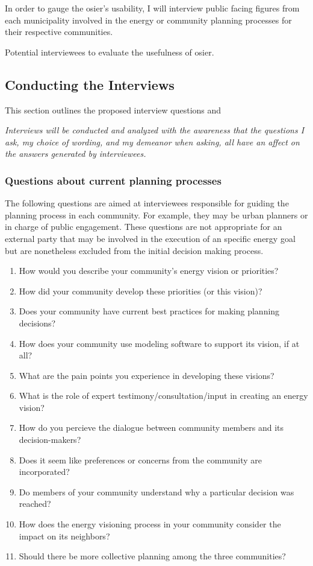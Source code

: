 In order to gauge the \ac{osier}'s usability, I will interview public facing
figures from each municipality involved in the energy or community planning
processes for their respective communities.


\begin{table}[ht!]
    \centering
    \caption{Potential interviewees to evaluate the usefulness of \ac{osier}.}
    
    \label{table:subjects}
\end{table}


\subsection{Conducting the Interviews}

This section outlines the proposed interview questions and 

\textit{Interviews will be conducted and analyzed with the awareness that the
questions I ask, my choice of wording, and my demeanor when asking, all have an
affect on the answers generated by interviewees.}

\subsubsection{Questions about current planning processes}
The following questions are aimed at interviewees responsible for guiding the
planning process in each community. For example, they may be urban planners or
in charge of public engagement. These questions are not appropriate for an
external party that may be involved in the execution of an specific energy goal
but are nonetheless excluded from the initial decision making process.

\begin{enumerate}
    \item How would you describe your community's energy vision or priorities?
    \item How did your community develop these priorities (or this vision)?
    \item Does your community have current best practices for making planning
    decisions?
    \item How does your community use modeling software to support its vision,
    if at all?
    \item What are the pain points you experience in developing these visions?
    \item What is the role of expert testimony/consultation/input in creating an
    energy vision?
    \item How do you percieve the dialogue between community members and its
    decision-makers?
    \item Does it seem like preferences or concerns from the community are
    incorporated? 
    \item Do members of your community understand why a particular decision was
    reached?
    \item How does the energy visioning process in your community consider the
    impact on its neighbors?
    \item Should there be more collective planning among the three communities?
\end{enumerate}

